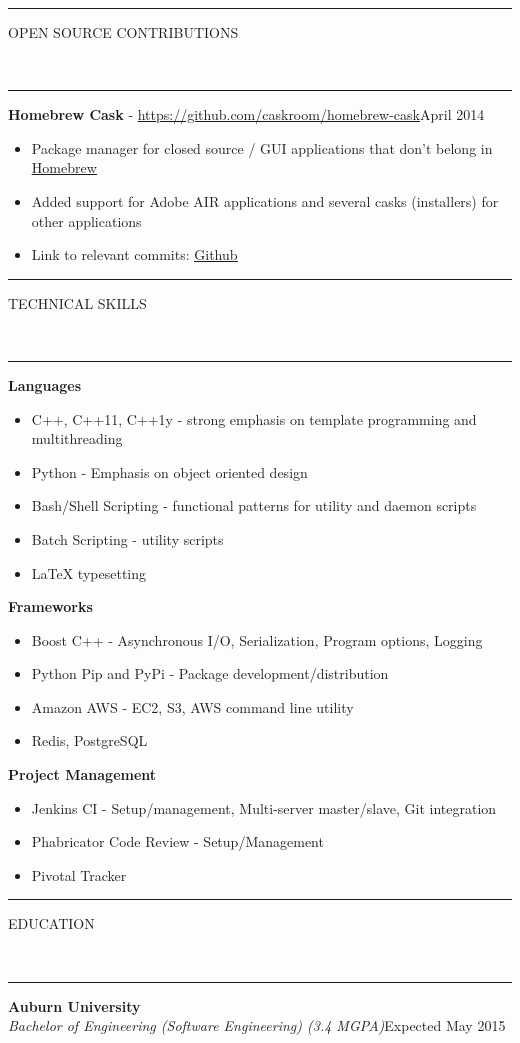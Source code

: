 \documentclass[10pt, letterpaper, oneside]{article}
\newcommand{\HRule}[2]{\textcolor{#1}{\rule{\linewidth}{#2}}}
\newcommand{\sectiontitle}[1]{\begin{minipage}{\textwidth}\HRule{black}{0.25mm}\vspace{-10pt}\begin{center}\Large\MakeUppercase{#1}\end{center}\end{minipage}\\\HRule{light-grey}{0.15mm}\vspace{\baselineskip}}
\newenvironment{ressection}[1]{
  \sectiontitle{#1}}
  {\vspace{0.5\baselineskip}}
\newenvironment{tightressection}[1]{
  \begin{minipage}{\textwidth}
  \sectiontitle{#1}}
  {\vspace{2\baselineskip}\end{minipage}}
\newcommand{\resitem}[1]{
    \vspace{2pt}
    \item \begin{flushleft} #1 \end{flushleft}
}
\newcommand{\resedentry}[3]{
  \begin{minipage}{\textwidth}
  \vspace{-10pt}
  \textbf{#1}\\
  \textit{#2}\hfill\textcolor{light-grey}{#3}\\
  \vspace{0.5\baselineskip}
  \end{minipage}
}
\newcommand{\resentryheader}[3]{
    \vspace{-5pt}
    \textbf{#1} - #2\hspace{\stretch{1}}\textcolor{light-grey}{#3}\\
}
\newenvironment{resentry}[3]{
  \begin{minipage}{\textwidth}
    \resentryheader{#1}{#2}{#3}
        \vspace{-\baselineskip}
    \begin{itemize}[noitemsep,nolistsep]
}{
    \end{itemize}
        \vspace{\baselineskip}
        \end{minipage}
}
\newcommand{\restechentryheader}[1]{
    \vspace{-5pt}
    \textbf{#1}\\
}
\newenvironment{restechentry}[1]{
  \begin{minipage}{\textwidth}
    \restechentryheader{#1}
        \vspace{-\baselineskip}
    \begin{itemize}[noitemsep,nolistsep]
}{
    \end{itemize}
        \vspace{\baselineskip}
        \end{minipage}
}
\begin{document}
\begin{ressection}{Open Source Contributions}
  \begin{resentry}{Homebrew Cask}{\href{https://github.com/caskroom/homebrew-cask}{https://github.com/caskroom/homebrew-cask}}{April 2014}
    \resitem{Package manager for closed source / GUI applications that don't belong in \underline{\href{http://brew.sh/}{Homebrew}}}
    \resitem{Added support for Adobe AIR applications and several casks (installers) for other applications}
    \resitem{Link to relevant commits: \underline{\href{https://github.com/caskroom/homebrew-cask/commits?author=vmrob}{Github}}}
  \end{resentry}

\end{ressection}

\begin{tightressection}{Technical Skills}
  \begin{restechentry}{Languages}
    \resitem{C++, C++11, C++1y - strong emphasis on template programming and multithreading}
    \resitem{Python - Emphasis on object oriented design}
    \resitem{Bash/Shell Scripting - functional patterns for utility and daemon scripts}
    \resitem{Batch Scripting - utility scripts}
    \resitem{LaTeX typesetting}
  \end{restechentry}
  \begin{restechentry}{Frameworks}
    \resitem{Boost C++ - Asynchronous I/O, Serialization, Program options, Logging}
    \resitem{Python Pip and PyPi - Package development/distribution}
    \resitem{Amazon AWS - EC2, S3, AWS command line utility}
    \resitem{Redis, PostgreSQL}
  \end{restechentry}
  \begin{restechentry}{Project Management}
    \resitem{Jenkins CI - Setup/management, Multi-server master/slave, Git integration}
    \resitem{Phabricator Code Review - Setup/Management}
    \resitem{Pivotal Tracker}
  \end{restechentry}
\end{tightressection}
 
\vspace{-15pt}
\begin{tightressection}{education}
  \resedentry{Auburn University}{Bachelor of Engineering (Software Engineering) (3.4 MGPA)}{Expected May 2015}
\end{tightressection}
 
\end{document}
